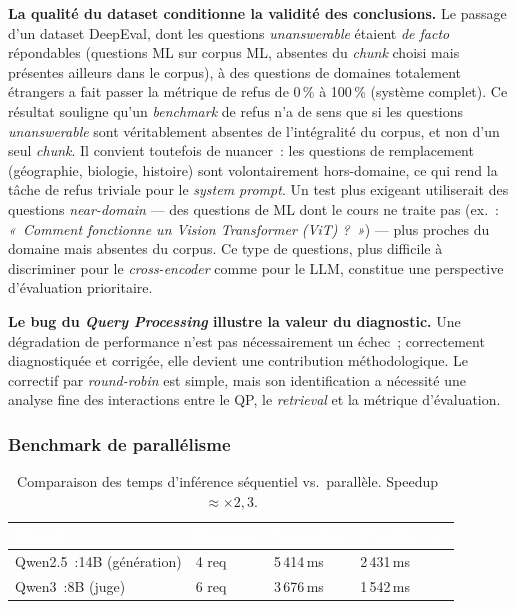 \documentclass[11pt,a4paper]{article}
\begin{document}
\textbf{La qualité du dataset conditionne la validité des conclusions.} Le passage d'un dataset DeepEval, dont les questions \textit{unanswerable} étaient \textit{de facto} répondables (questions ML sur corpus ML, absentes du \textit{chunk} choisi mais présentes ailleurs dans le corpus), à des questions de domaines totalement étrangers a fait passer la métrique de refus de 0\,\% à 100\,\% (système complet). Ce résultat souligne qu'un \textit{benchmark} de refus n'a de sens que si les questions \textit{unanswerable} sont véritablement absentes de l'intégralité du corpus, et non d'un seul \textit{chunk}. Il convient toutefois de nuancer~: les questions de remplacement (géographie, biologie, histoire) sont volontairement hors-domaine, ce qui rend la tâche de refus triviale pour le \textit{system prompt}. Un test plus exigeant utiliserait des questions \textit{near-domain} --- des questions de ML dont le cours ne traite pas (ex.~: \textit{«~Comment fonctionne un Vision Transformer (ViT) ?~»}) --- plus proches du domaine mais absentes du corpus. Ce type de questions, plus difficile à discriminer pour le \textit{cross-encoder} comme pour le LLM, constitue une perspective d'évaluation prioritaire.

\textbf{Le bug du \textit{Query Processing} illustre la valeur du diagnostic.} Une dégradation de performance n'est pas nécessairement un échec~; correctement diagnostiquée et corrigée, elle devient une contribution méthodologique. Le correctif par \textit{round-robin} est simple, mais son identification a nécessité une analyse fine des interactions entre le QP, le \textit{retrieval} et la métrique d'évaluation.


\subsubsection*{Benchmark de parallélisme}

\begin{table}[H]
\centering
\begin{tabularx}{0.8\linewidth}{L{3.5cm} C{2.5cm} C{2.5cm} C{2.5cm}}
\toprule
{}
\textcolor{white}{\textbf{Modèle}} &
\textcolor{white}{\textbf{Requêtes}} &
\textcolor{white}{\textbf{Séquentiel}} &
\textcolor{white}{\textbf{Parallèle (4)}} \\
\midrule
Qwen2.5~:14B (génération) & 4 req  & 5\,414\,ms & 2\,431\,ms \\
Qwen3~:8B (juge)        & 6 req  & 3\,676\,ms & 1\,542\,ms \\
\bottomrule
\end{tabularx}
\caption{Comparaison des temps d'inférence séquentiel vs.\ parallèle. Speedup~$\approx \times 2,3$.}
\label{tab:benchmark}
\end{table}
\end{document}
